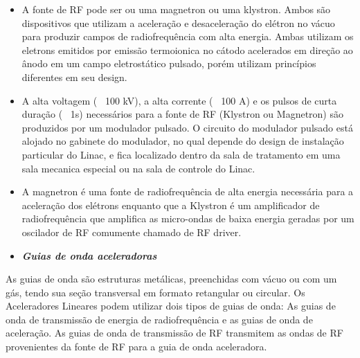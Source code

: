 \documentclass[11pt,a4paper]{article}
\begin{document}
    \begin{itemize}
		\item A fonte de RF pode ser ou uma magnetron ou uma klystron. Ambos são dispositivos que utilizam a aceleração e desaceleração do elétron no vácuo para produzir campos de radiofrequência com alta energia. Ambas utilizam os eletrons emitidos por emissão termoionica no cátodo acelerados em direção ao ânodo em um campo eletrostático pulsado, porém utilizam princípios diferentes em seu design.
		\item A alta voltagem (~ 100 kV), a alta corrente (~ 100 A) e os pulsos de curta duração ( ~1s) necessários para a fonte de RF (Klystron ou Magnetron) são produzidos por um modulador pulsado. O circuito do modulador pulsado está alojado no gabinete do modulador, no qual depende do design de instalação particular do Linac, e fica localizado dentro da sala de tratamento em uma sala mecanica especial ou na sala de controle do Linac.
		\item A magnetron é uma fonte de radiofrequência de alta energia necessária para a aceleração dos elétrons enquanto que a Klystron é um amplificador de radiofrequência que amplifica as micro-ondas de baixa energia geradas por um oscilador de RF comumente chamado de RF driver. 
	\end{itemize}
                
                \begin{itemize}
                    \item \textbf{\textit{\textcolor{CarnationPink}{Guias de onda aceleradoras}}}
                \end{itemize}
                 
    As guias de onda são estruturas metálicas, preenchidas com vácuo ou com um gás, tendo sua seção transversal em formato retangular ou circular. Os Aceleradores Lineares podem utilizar dois tipos de guias de onda: As guias de onda de transmissão de energia de radiofrequência e as guias de onda de aceleração.  As guias de onda de transmissão de RF transmitem as ondas de RF provenientes da fonte de RF para a guia de onda aceleradora. 
\end{document}
